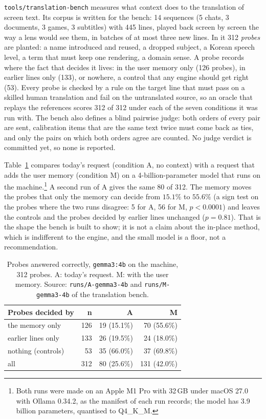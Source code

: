 \texttt{tools/translation-bench} measures what context does to the translation of screen text. Its corpus is written for the bench: 14 sequences
(5 chats, 3 documents, 3 games, 3 subtitles) with 445 lines, played back screen by screen the way a lens would see them, in batches of at most three new lines. In it
312 \emph{probes} are planted: a name introduced and reused, a dropped subject, a Korean speech level, a term that must keep one rendering, a domain sense. A probe records where
the fact that decides it lives: in the user memory only (126 probes), in earlier lines only (133), or nowhere, a control that any engine
should get right (53). Every probe is checked by a rule on the target line that must pass on a skilled human translation and fail on the untranslated source, so an
oracle that replays the references scores 312 of 312 under each of the seven conditions it was run with. The bench also defines a blind pairwise judge: both orders of every pair are sent, calibration items that are the same text twice
must come back as ties, and only the pairs on which both orders agree are counted. No judge verdict is committed yet, so none is reported.

Table~\ref{tab:probes} compares today's request (condition A, no context) with a request that adds the user memory (condition M) on a 4-billion-parameter model that runs on the
machine.\footnote{Both runs were made on an Apple M1 Pro with 32\,GB under macOS 27.0 with Ollama 0.34.2, as the manifest of each run records; the model has 3.9 billion parameters, quantised to Q4\_K\_M.} A second run of A gives the same 80 of 312. The memory moves the probes that only the memory can decide from $15.1\%$ to $55.6\%$ (a sign test on the
probes where the two runs disagree: 5 for A, 56 for M, $p<0.0001$) and leaves the controls and the probes decided by earlier lines unchanged
($p=0.81$). That is the shape the bench is built to show; it is not a claim about the in-place method, which is
indifferent to the engine, and the small model is a floor, not a recommendation.

\begin{table}[t]
\centering
\caption{Probes answered correctly, \texttt{gemma3:4b} on the machine, 312 probes. A: today's request. M: with the user memory.
Source: \texttt{runs/A-gemma3-4b} and \texttt{runs/M-gemma3-4b} of the translation bench.}\label{tab:probes}
\small
\begin{tabular}{@{}lrrr@{}}
\toprule
Probes decided by & n & A & M\\
\midrule
the memory only & 126 & 19 (15.1\%) & 70 (55.6\%)\\
earlier lines only & 133 & 26 (19.5\%) & 24 (18.0\%)\\
nothing (controls) & 53 & 35 (66.0\%) & 37 (69.8\%)\\
all & 312 & 80 (25.6\%) & 131 (42.0\%)\\
\bottomrule
\end{tabular}
\end{table}

